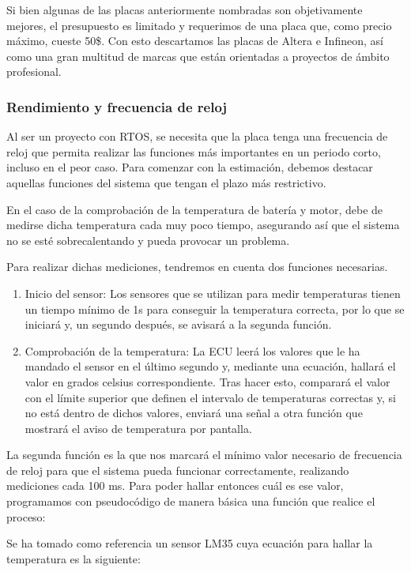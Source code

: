 Si bien algunas de las placas anteriormente nombradas son objetivamente mejores, el presupuesto es limitado y requerimos de una placa que, como precio máximo, cueste 50\$. Con esto descartamos las placas de Altera e Infineon, así como una gran multitud de marcas que están orientadas a proyectos de ámbito profesional. 

\subsubsection*{Rendimiento y frecuencia de reloj}

Al ser un proyecto con RTOS, se necesita que la placa tenga una frecuencia de reloj que permita realizar las funciones más importantes en un periodo corto, incluso en el peor caso. Para comenzar con la estimación, debemos destacar aquellas funciones del sistema que tengan el plazo más restrictivo. 

En el caso de la comprobación de la temperatura de batería y motor, debe de medirse dicha temperatura cada muy poco tiempo, asegurando así que el sistema no se esté sobrecalentando y pueda provocar un problema. 

Para realizar dichas mediciones, tendremos en cuenta dos funciones necesarias. 

\begin{enumerate}
    \item Inicio del sensor: Los sensores que se utilizan para medir temperaturas tienen un tiempo mínimo de 1s para conseguir la temperatura correcta, por lo que se iniciará y, un segundo después, se avisará a la segunda función.
    \item Comprobación de la temperatura: La ECU leerá los valores que le ha mandado el sensor en el último segundo y, mediante una ecuación, hallará el valor en grados celsius correspondiente. Tras hacer esto, comparará el valor con el límite superior que definen el intervalo de temperaturas correctas y, si no está dentro de dichos valores, enviará una señal a otra función que mostrará el aviso de temperatura por pantalla. 
\end{enumerate}

La segunda función es la que nos marcará el mínimo valor necesario de frecuencia de reloj para que el sistema pueda funcionar correctamente, realizando mediciones cada 100 ms. Para poder hallar entonces cuál es ese valor, programamos con pseudocódigo de manera básica una función que realice el proceso:


Se ha tomado como referencia un sensor LM35 cuya ecuación para hallar la temperatura es la siguiente: 

